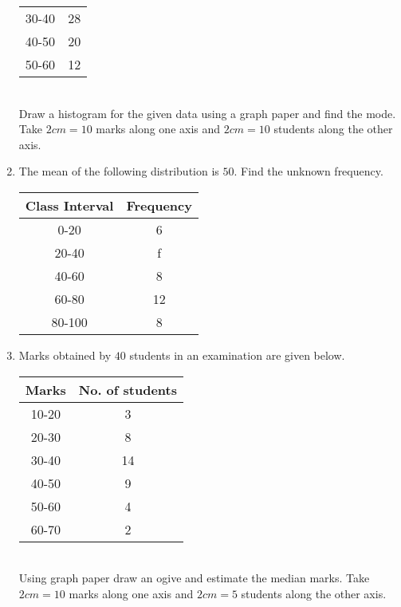 \documentclass{article}
\begin{document}
\begin{enumerate}
\begin{tabular}{|c|c|}
			30-40 & 28 \\
			40-50 & 20 \\
			50-60 & 12 \\
			\hline
		\end{tabular}
		\\Draw a histogram for the given data using a graph paper and find the mode. Take $2 cm = 10$ marks along one axis and $2 cm= 10$ students along the other axis.
	\item The mean of the following distribution is $50$. Find the unknown frequency.
		\centering
		\begin{tabular}{|c|c|}
			\hline
			Class Interval & Frequency \\
			\hline
			0-20 & 6 \\
			20-40 & f \\
			40-60 & 8 \\
			60-80 & 12 \\
			80-100 & 8 \\
			\hline
		\end{tabular}
	\item Marks obtained by $40$ students in an examination are given below.
		\centering
		\begin{tabular}{|c|c|}
			\hline
			Marks & No. of students \\
			\hline
			10-20 & 3 \\
			20-30 & 8 \\
			30-40 & 14 \\
			40-50 & 9 \\
			50-60 & 4 \\
			60-70 & 2 \\
			\hline
		\end{tabular}
		\\Using graph paper draw an ogive and estimate the median marks. Take $2 cm = 10$ marks along one axis and $ 2cm = 5$ students along the other axis.
\end{enumerate}
\end{document}
